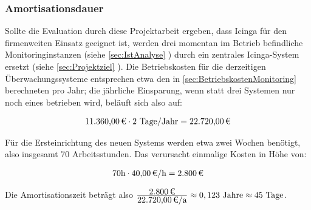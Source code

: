 \subsubsection{Amortisationsdauer}
\label{sec:Amortisationsdauer}
Sollte die Evaluation durch diese Projektarbeit ergeben, dass \glqq{}Icinga\grqq{} für den firmenweiten Einsatz geeignet ist, werden drei momentan im Betrieb befindliche Monitoringinstanzen (siehe \ref{sec:IstAnalyse} ) durch ein zentrales \glqq{}Icinga\grqq{}-System ersetzt (siehe \ref{sec:Projektziel} ). Die Betriebskosten für die derzeitigen Überwachungssysteme entsprechen etwa den in \ref{sec:BetriebskostenMonitoring}  berechneten  pro Jahr; die jährliche Einsparung, wenn statt drei Systemen nur noch eines betrieben wird, beläuft sich also auf:

\begin{eqnarray}
\eur{11.360,00} \cdot 2 \mbox{ Tage/Jahr} = \eur{22.720,00}
\end{eqnarray}

Für die Ersteinrichtung des neuen Systems werden etwa zwei Wochen benötigt, also insgesamt 70 Arbeitsstunden. Das verursacht einmalige Kosten in Höhe von:

\begin{eqnarray}
70 \mbox{h} \cdot \eur{40,00} \mbox{/h} = \eur{2.800}
\end{eqnarray}
\setcounter{equation}{0}

Die Amortisationszeit beträgt also $\frac{\eur{2.800}}{\eur{22.720,00}\mbox{/a}} \approx 0,123 \mbox{ Jahre} \approx 45 \mbox{ Tage}$.